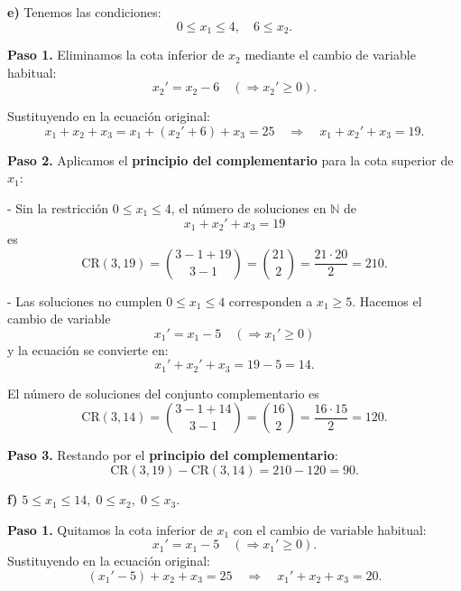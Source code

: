 \documentclass[a4paper,12pt]{article}
\begin{document}
\begin{ejercicio}[title=Ejercicio 31]

\textbf{e)}  
Tenemos las condiciones: 
\[
0 \le x_1 \le 4, \quad 6 \le x_2.
\]

\textbf{Paso 1.} Eliminamos la cota inferior de $x_2$ mediante el cambio de variable habitual:
\[
x_2' = x_2 - 6 \quad (\Rightarrow x_2' \ge 0).
\]

Sustituyendo en la ecuación original:
\[
x_1 + x_2 + x_3 = x_1 + (x_2'+6) + x_3 = 25 \quad \Longrightarrow \quad x_1 + x_2' + x_3 = 19.
\]

\textbf{Paso 2.} Aplicamos el \textbf{principio del complementario} para la cota superior de $x_1$:

- Sin la restricción $0 \le x_1 \le 4$, el número de soluciones en $\mathbb{N}$ de
\[
x_1 + x_2' + x_3 = 19
\]
es
\[
\mathrm{CR}(3,19) = \binom{3-1+19}{3-1} = \binom{21}{2} = \frac{21 \cdot 20}{2} = 210.
\]

- Las soluciones no cumplen $0 \le x_1 \le 4$ corresponden a $x_1 \ge 5$. Hacemos el cambio de variable
\[
x_1' = x_1 - 5 \quad (\Rightarrow x_1' \ge 0)
\]
y la ecuación se convierte en:
\[
x_1' + x_2' + x_3 = 19 - 5 = 14.
\]

El número de soluciones del conjunto complementario es
\[
\mathrm{CR}(3,14) = \binom{3-1+14}{3-1}= \binom{16}{2} = \frac{16 \cdot 15}{2} = 120.
\]

\textbf{Paso 3.} Restando por el \textbf{principio del complementario}:
\[
\mathrm{CR}(3,19) - \mathrm{CR}(3,14) = 210 - 120 = \boxed{90}.
\]

\textbf{f)} \(5 \le x_1 \le 14,\; 0 \le x_2,\; 0 \le x_3.\)

\medskip

\textbf{Paso 1.} Quitamos la cota inferior de \(x_1\) con el cambio de variable habitual:
\[
x_1' = x_1 - 5 \quad (\Rightarrow x_1' \ge 0).
\]
Sustituyendo en la ecuación original:
\[
(x_1'-5)+x_2+x_3=25 \quad\Longrightarrow\quad x_1' + x_2 + x_3 = 20.
\]

\end{ejercicio}
\end{document}
